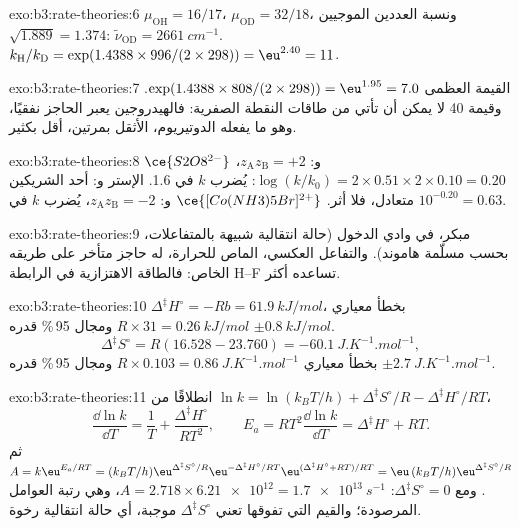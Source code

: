 \begin{solution}{exo:b3:rate-theories:6}
$\mu_{\mathrm{OH}} = 16/17$، $\mu_{\mathrm{OD}} = 32/18$، ونسبة العددين الموجيين $\sqrt{1.889} = 1.374$:
$\tilde\nu_{\mathrm{OD}} = \qty{2661}{cm^{-1}}$. $k_{\mathrm H}/k_{\mathrm D} = \exp(1.4388 \times 996/(2 \times 298)) = \eu^{2.40} = 11$.
\end{solution}

\begin{solution}{exo:b3:rate-theories:7}
القيمة العظمى $\exp(1.4388 \times 808/(2 \times 298)) = \eu^{1.95} = 7.0$. وقيمة 40 لا يمكن أن تأتي من
طاقات النقطة الصفرية: فالهيدروجين يعبر الحاجز نفقيًا، وهو ما يفعله الدوتيريوم،
الأثقل بمرتين، أقل بكثير.
\end{solution}

\begin{solution}{exo:b3:rate-theories:8}
$\ce{S2O8^{2-}}$ و: $z_{\mathrm A}z_{\mathrm B} = +2$، $\log(k/k_0) = 2 \times 0.51 \times 2 \times 0.10 = 0.20$: يُضرب $k$
في 1.6. الإستر و: أحد الشريكين متعادل، فلا أثر.
$\ce{[Co(NH3)5Br]^{2+}}$ و: $z_{\mathrm A}z_{\mathrm B} = -2$، يُضرب $k$ في $10^{-0.20} = 0.63$.
\end{solution}

\begin{solution}{exo:b3:rate-theories:9}
مبكر، في وادي الدخول (حالة انتقالية شبيهة بالمتفاعلات، بحسب مسلّمة
هاموند). والتفاعل العكسي، الماص للحرارة، له حاجز متأخر على
طريقه الخاص: فالطاقة الاهتزازية في الرابطة H--F تساعده أكثر.
\end{solution}

\begin{solution}{exo:b3:rate-theories:10}
$\Delta^{\ddagger}H^\circ = -Rb = \qty{61.9}{kJ/mol}$، بخطأ معياري $R \times 31 = \qty{0.26}{kJ/mol}$ 
ومجال 95\,\% قدره $\pm\qty{0.8}{kJ/mol}$.
\[
  \Delta^{\ddagger}S^\circ = R(16.528 - 23.760) = \qty{-60.1}{J.K^{-1}.mol^{-1}},
\]
بخطأ معياري $R \times 0.103 = \qty{0.86}{J.K^{-1}.mol^{-1}}$ ومجال 95\,\% قدره $\pm\qty{2.7}{J.K^{-1}.mol^{-1}}$.
\end{solution}

\begin{solution}{exo:b3:rate-theories:11}
انطلاقًا من $\ln k = \ln(k_BT/h) + \Delta^{\ddagger}S^\circ/R - \Delta^{\ddagger}H^\circ/RT$،
\[
  \frac{\dd\ln k}{\dd T} = \frac1T + \frac{\Delta^{\ddagger}H^\circ}{RT^2}, \qquad
  E_a = RT^2\frac{\dd\ln k}{\dd T} = \Delta^{\ddagger}H^\circ + RT .
\] ثم $A = k\eu^{E_a/RT} = (k_BT/h)\eu^{\Delta^{\ddagger}S^\circ/R}\eu^{-\Delta^{\ddagger}H^\circ/RT}\eu^{(\Delta^{\ddagger}H^\circ + RT)/RT} =
\eu\,(k_BT/h)\eu^{\Delta^{\ddagger}S^\circ/R}$. ومع $\Delta^{\ddagger}S^\circ = 0$: $A = 2.718 \times \num{6.21e12} = \qty{1.7e13}{s^{-1}}$، وهي
رتبة العوامل المرصودة؛ والقيم التي تفوقها تعني $\Delta^{\ddagger}S^\circ$ موجبة، أي حالة
انتقالية رخوة.
\end{solution}

